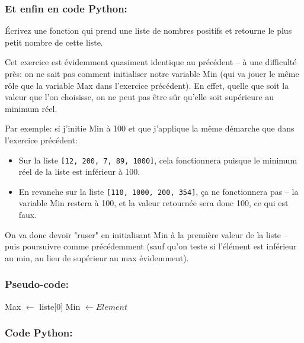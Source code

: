 \documentclass[12pt]{article}
\begin{document}
\begin{MaReponse}
		\subsubsection*{Et enfin en code Python:}
	\end{MaReponse}


	\begin{MonExo}
		Écrivez une fonction qui prend une liste de nombres positifs et retourne le plus petit nombre de cette liste.
	\end{MonExo}
	
	\begin{MaReponse}
		Cet exercice est évidemment quasiment identique au précédent -- à une difficulté près: on ne sait pas comment initialiser notre variable Min (qui va jouer le même rôle que la variable Max dans l'exercice précédent). En effet, quelle que soit la valeur que l'on choisisse, on ne peut pas être sûr qu'elle soit supérieure au minimum réel.
	
		Par exemple: si j'initie Min à 100 et que j'applique la même démarche que dans l'exercice précédent:
		\begin{itemize}
			\item Sur la liste \texttt{[12, 200, 7, 89, 1000]}, cela fonctionnera puisque le minimum réel de la liste est inférieur à 100.
			\item En revanche sur la liste \texttt{[110, 1000, 200, 354]}, ça ne fonctionnera pas -- la variable Min restera à 100, et la valeur retournée sera donc 100, ce qui est faux.
		\end{itemize}

		On va donc devoir "ruser" en initialisant Min à la première valeur de la liste -- puis poursuivre comme précédemment (sauf qu'on teste si l'élément est inférieur au min, au lieu de supérieur au max évidemment).
	
		\subsubsection*{Pseudo-code:}
		\begin{algorithmic}[1]
			\State Max $\leftarrow$ liste[0]
			\State Min $\leftarrow Element$
			\EndIf
			\EndFor
			\State{}
			\EndFunction
		\end{algorithmic}
	
		\subsubsection*{Code Python:}
	\end{MaReponse}
\end{document}
